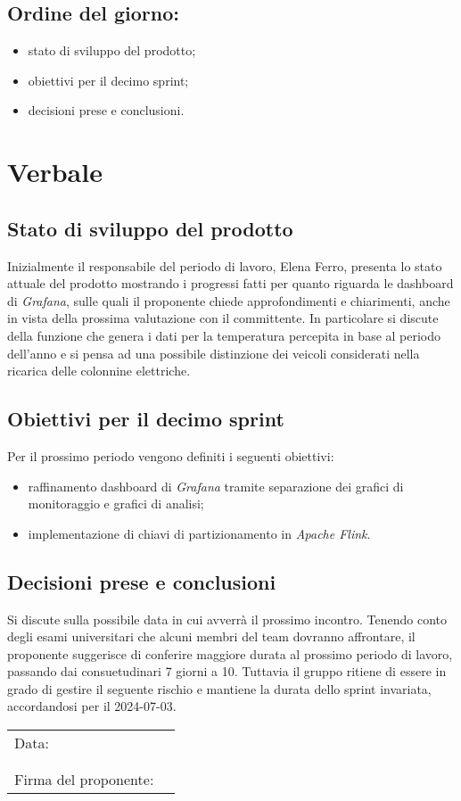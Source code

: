 \documentclass[italian,12pt]{article}
\begin{document}
\subsection*{Ordine del giorno:}
\begin{itemize}
	\item stato di sviluppo del prodotto;
	\item obiettivi per il decimo sprint;
	\item decisioni prese e conclusioni.
\end{itemize}

\newpage

\section{Verbale}

\subsection{Stato di sviluppo del prodotto}
Inizialmente il responsabile del periodo di lavoro, Elena Ferro, presenta lo stato attuale del prodotto mostrando i progressi fatti
per quanto riguarda le dashboard di \textit{Grafana}, sulle quali il proponente chiede approfondimenti e chiarimenti,
anche in vista della prossima valutazione con il committente.
In particolare si discute della funzione che genera i dati per la temperatura percepita in base al periodo dell'anno e si pensa ad una possibile
distinzione dei veicoli considerati nella ricarica delle colonnine elettriche.

\subsection{Obiettivi per il decimo sprint}
Per il prossimo periodo vengono definiti i seguenti obiettivi:
\begin{itemize}
	\item raffinamento dashboard di \textit{Grafana} tramite separazione dei grafici di monitoraggio e grafici di analisi;
	\item implementazione di chiavi di partizionamento in \textit{Apache Flink}.
\end{itemize}

\subsection{Decisioni prese e conclusioni}
Si discute sulla possibile data in cui avverrà il prossimo incontro. Tenendo conto degli esami universitari che alcuni membri del team dovranno affrontare,
il proponente suggerisce di conferire maggiore durata al prossimo periodo di lavoro, passando dai consuetudinari 7 giorni a 10. Tuttavia il gruppo
ritiene di essere in grado di gestire il seguente rischio e mantiene la durata dello sprint invariata, accordandosi per il 2024-07-03.

\begin{table}[b]
	\begin{tabular}{@{}p{5cm}p{10cm}@{}}
		Data:                 & \hrulefill \\
		                      &            \\
		                      &            \\
		Firma del proponente: & \hrulefill \\
	\end{tabular}
\end{table}
\end{document}
